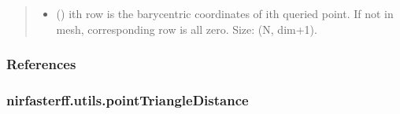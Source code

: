 \documentclass[letterpaper,10pt,english]{sphinxmanual}
\begin{document}
\begin{fulllineitems}
\begin{quote}
\begin{description}
\begin{itemize}
\item {} 
\sphinxAtStartPar
{} () \textendash{} i\sphinxhyphen{}th row is the barycentric coordinates of i\sphinxhyphen{}th queried point. If not in mesh, corresponding row is all zero. Size: (N, dim+1).

\end{itemize}


\end{description}\end{quote}
\subsubsection*{References}

\sphinxAtStartPar
{}

\end{fulllineitems}


\sphinxstepscope


\subsubsection{nirfasterff.utils.pointTriangleDistance}
\label{\detokenize{_autosummary/nirfasterff.utils.pointTriangleDistance:nirfasterff-utils-pointtriangledistance}}\label{\detokenize{_autosummary/nirfasterff.utils.pointTriangleDistance::doc}}
\end{document}

